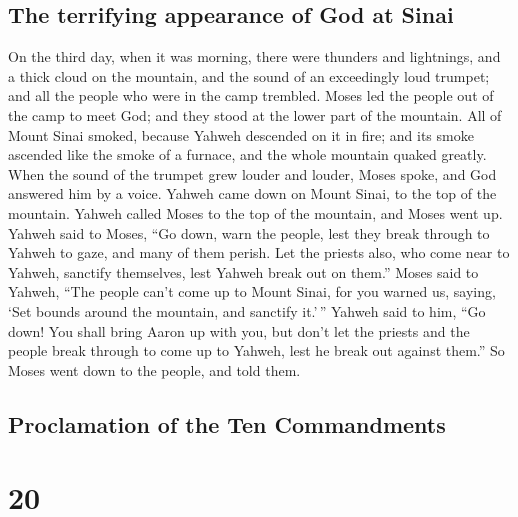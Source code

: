 \hypertarget{the-terrifying-appearance-of-god-at-sinai}{%
\subsection{The terrifying appearance of God at
Sinai}\label{the-terrifying-appearance-of-god-at-sinai}}

 On the third day, when it was morning, there were
thunders and lightnings, and a thick cloud on the mountain, and the
sound of an exceedingly loud trumpet; and all the people who were in the
camp trembled.  Moses led the people out of the camp to
meet God; and they stood at the lower part of the mountain.
 All of Mount Sinai smoked, because Yahweh descended on
it in fire; and its smoke ascended like the smoke of a furnace, and the
whole mountain quaked greatly.  When the sound of the
trumpet grew louder and louder, Moses spoke, and God answered him by a
voice.  Yahweh came down on Mount Sinai, to the top of
the mountain. Yahweh called Moses to the top of the mountain, and Moses
went up.  Yahweh said to Moses, ``Go down, warn the
people, lest they break through to Yahweh to gaze, and many of them
perish.  Let the priests also, who come near to Yahweh,
sanctify themselves, lest Yahweh break out on them.'' 
Moses said to Yahweh, ``The people can't come up to Mount Sinai, for you
warned us, saying, `Set bounds around the mountain, and sanctify
it.'\,''  Yahweh said to him, ``Go down! You shall bring
Aaron up with you, but don't let the priests and the people break
through to come up to Yahweh, lest he break out against them.''
 So Moses went down to the people, and told them.

\hypertarget{proclamation-of-the-ten-commandments}{%
\subsection{Proclamation of the Ten
Commandments}\label{proclamation-of-the-ten-commandments}}

\hypertarget{section-19}{%
\section{20}\label{section-19}}

